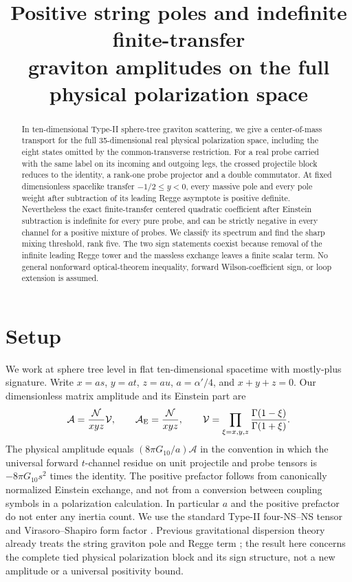 \documentclass[11pt]{article}
\title{Positive string poles and indefinite finite-transfer\\ graviton amplitudes on the full physical polarization space}
\author{}
\date{}
\newcommand{\cA}{\mathcal A}
\begin{document}
\maketitle
\begin{abstract}
In ten-dimensional Type-II sphere-tree graviton scattering, we give a
center-of-mass transport for the full 35-dimensional real physical
polarization space, including the eight states omitted by the common-transverse
restriction. For a real probe carried with the same label on its incoming and
outgoing legs, the crossed projectile block reduces to the identity, a
rank-one probe projector and a double commutator. At fixed dimensionless
spacelike transfer $-1/2\le y<0$, every massive pole and every pole weight
after subtraction of its leading Regge asymptote is positive definite.
Nevertheless the exact finite-transfer centered quadratic coefficient after
Einstein subtraction is indefinite for every pure probe, and can be strictly
negative in every channel for a positive mixture of probes. We classify its
spectrum and find the sharp mixing threshold, rank five. The two sign
statements coexist because removal of the infinite leading Regge tower and
the massless exchange leaves a finite scalar term. No general nonforward
optical-theorem inequality, forward Wilson-coefficient sign, or loop
extension is assumed.
\end{abstract}

\section{Setup}
We work at sphere tree level in flat ten-dimensional spacetime with
mostly-plus signature. Write $x=a s$, $y=a t$, $z=a u$, $a=\alpha'/4$,
and $x+y+z=0$. Our dimensionless matrix amplitude and its Einstein part are
\begin{equation}
 \cA=\frac{\mathcal N}{xyz}\mathcal V,\qquad
 \cA_{\rm E}=\frac{\mathcal N}{xyz},\qquad
 \mathcal V=\prod_{\xi=x,y,z}\frac{\Gamma(1-\xi)}{\Gamma(1+\xi)}.
 \label{eq:amplitude}
\end{equation}
The physical amplitude equals $(8\pi G_{10}/a)\cA$ in the convention in
which the universal forward $t$-channel residue on unit projectile and
probe tensors is $-8\pi G_{10}s^2$ times the identity. The positive
prefactor follows from canonically normalized Einstein exchange, and
not from a conversion between coupling symbols in a polarization
calculation. In particular $a$ and the positive prefactor do not enter
any inertia count. We use the standard Type-II four-NS--NS tensor and
Virasoro--Shapiro form factor \cite{pasukonis,t8review}. Previous
gravitational dispersion theory already treats the string graviton pole
and Regge term \cite{tokuda,noumi,hamada}; the result here concerns the
complete tied physical polarization block and its sign structure, not
a new amplitude or a universal positivity bound.
\end{document}
